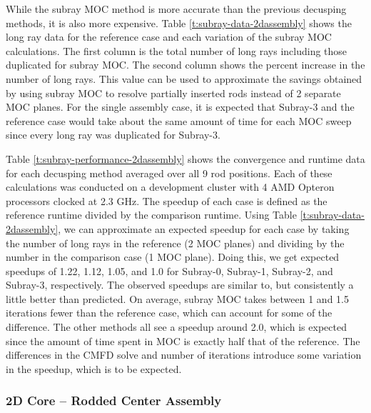 While the subray MOC method is more accurate than the previous decusping methods, it is also more expensive.  Table \ref{t:subray-data-2dassembly} shows the long ray data for the reference case and each variation of the subray MOC calculations.  The first column is the total number of long rays including those duplicated for subray MOC.  The second column shows the percent increase in the number of long rays.  This value can be used to approximate the savings obtained by using subray MOC to resolve partially inserted rods instead of 2 separate MOC planes.  For the single assembly case, it is expected that Subray-3 and the reference case would take about the same amount of time for each MOC sweep since every long ray was duplicated for Subray-3.

Table \ref{t:subray-performance-2dassembly} shows the convergence and runtime data for each decusping method averaged over all 9 rod positions.  Each of these calculations was conducted on a development cluster with 4 AMD Opteron processors clocked at 2.3 GHz. The speedup of each case is defined as the reference runtime divided by the comparison runtime.  Using Table \ref{t:subray-data-2dassembly}, we can approximate an expected speedup for each case by taking the number of long rays in the reference (2 MOC planes) and dividing by the number in the comparison case (1 MOC plane).  Doing this, we get expected speedups of 1.22, 1.12, 1.05, and 1.0 for Subray-0, Subray-1, Subray-2, and Subray-3, respectively.  The observed speedups are similar to, but consistently a little better than predicted.  On average, subray MOC takes between 1 and 1.5 iterations fewer than the reference case, which can account for some of the difference.  The other methods all see a speedup around 2.0, which is expected since the amount of time spent in MOC is exactly half that of the reference.  The differences in the CMFD solve and number of iterations introduce some variation in the speedup, which is to be expected.

\subsubsection{2D Core -- Rodded Center Assembly}

